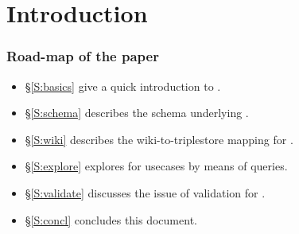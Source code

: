 
\section{Introduction}


\subsubsection*{Road-map of the paper}

\begin{itemize}
\item \S\ref{S:basics} give a quick introduction to \solasote.
\item \S\ref{S:schema} describes the schema underlying \solasote.
\item \S\ref{S:wiki} describes the wiki-to-triplestore mapping for \solasote.
\item \S\ref{S:explore} explores \solasote{} for usecases by means of queries.
\item \S\ref{S:validate} discusses the issue of validation for \solasote.
\item \S\ref{S:concl} concludes this document.
\end{itemize}

